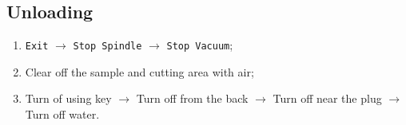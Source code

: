 \subsection{Unloading}
\label{sec:unloading}

\begin{enumerate}
	\item \texttt{Exit} \(\rightarrow\) \texttt{Stop Spindle}  \(\rightarrow\)
	      \texttt{Stop Vacuum};
	\item Clear off the sample and cutting area with air;
	\item Turn of using key  \(\rightarrow\) Turn
	      off from the back \(\rightarrow\) Turn off near the plug \(\rightarrow\) Turn off water.
\end{enumerate}

\newpage
